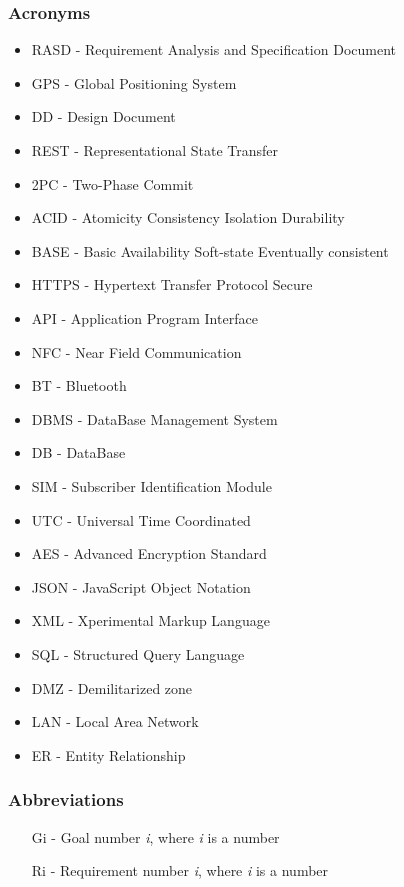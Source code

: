 \subsubsection{Acronyms}
\begin{itemize}
\item RASD - Requirement Analysis and Specification Document
\item GPS - Global Positioning System
\item DD - Design Document
\item REST - Representational State Transfer
\item 2PC - Two-Phase Commit
\item ACID - Atomicity Consistency Isolation Durability
\item BASE - Basic Availability Soft-state Eventually consistent
\item HTTPS - Hypertext Transfer Protocol Secure
\item API - Application Program Interface
\item NFC - Near Field Communication
\item BT - Bluetooth
\item DBMS - DataBase Management System
\item DB - DataBase
\item SIM - Subscriber Identification Module
\item UTC - Universal Time Coordinated
\item AES - Advanced Encryption Standard
\item JSON - JavaScript Object Notation
\item XML - Xperimental Markup Language
\item SQL - Structured Query Language
\item DMZ - Demilitarized zone
\item LAN - Local Area Network
\item ER - Entity Relationship
\end{itemize}

\subsubsection{Abbreviations}
\begin{itemize}
\item [Gi] - Goal number \textit{i}, where \textit{i} is a number
\item [Ri] - Requirement number \textit{i}, where \textit{i} is a number
\end{itemize}

